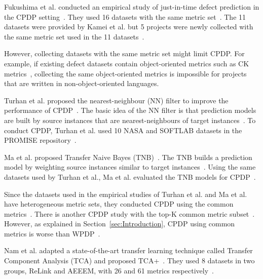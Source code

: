 Fukushima et al. conducted an empirical study of just-in-time defect prediction
in the CPDP setting~\cite{Fukushima14}. They used 16
datasets with the same metric set~\cite{Fukushima14}. The 11 datasets were
provided by Kamei et al. but 5 projects were newly collected with the same metric
set used in the 11 datasets~\cite{Fukushima14,Kamei13}.

However, collecting datasets with the
same metric set might limit CPDP. For example, if
existing defect datasets contain object-oriented metrics such as CK
metrics~\cite{Basili96}, collecting the same object-oriented metrics is
impossible for projects that are written in non-object-oriented languages.

Turhan et al. proposed the nearest-neighbour (NN) filter to improve the
performance of CPDP~\cite{Turhan09}. The basic idea of the NN
filter is that prediction models are built by source instances that are
nearest-neighbours of target instances~\cite{Turhan09}. To conduct
CPDP, Turhan et al. used 10 NASA and SOFTLAB datasets in the
PROMISE repository~\cite{promise12,Turhan09}.

Ma et al. proposed Transfer Naive Bayes (TNB)~\cite{Ma12}. The TNB builds a
prediction model by weighting source instances similar to target
instances~\cite{Ma12}. Using the same datasets used by Turhan et al., Ma et al.
evaluated the TNB models for CPDP~\cite{Ma12,Turhan09}.

Since the datasets used in the empirical studies of Turhan et al. and Ma et al.
have heterogeneous metric sets, they conducted CPDP using the common
metrics~\cite{Ma12,Turhan09}. There is another CPDP study with the top-K
common metric subset~\cite{He14subset}. However, as explained in
Section~\ref{sec:Introduction}, CPDP using common metrics is
worse than WPDP~\cite{He14subset,Turhan09}.



Nam et al. adapted a state-of-the-art
transfer learning technique called Transfer Component Analysis (TCA) and
proposed TCA+~\cite{Nam13}. They used 8
datasets in two groups, ReLink and AEEEM, with 26 and 61 metrics
respectively~\cite{Nam13}.
% 

